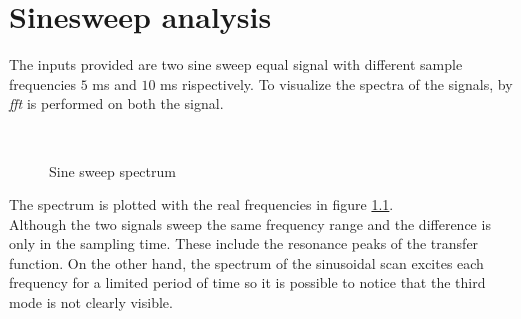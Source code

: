 \chapter{Sinesweep analysis}\label{chap:sinesweep}
The inputs provided are two sine sweep equal signal with different sample
frequencies \(5\) \si{\milli\second} and \(10\) \si{\milli\second} rispectively.
To visualize the spectra of the signals, by \emph{fft} is performed on both the
signal.
\begin{figure}[htb]
	\centering
		\,
	\caption{Sine sweep spectrum}
	\label{fig:spectral}
\end{figure}
The spectrum is plotted with the real frequencies in figure \ref{fig:spectral}.\\
Although the two signals sweep the same frequency range and the difference is
only in the sampling time. These include the resonance peaks of the transfer
function.
On the other hand, the spectrum of the sinusoidal scan excites each frequency
for a limited period of time so it is possible to notice that the third mode is
not clearly visible.
